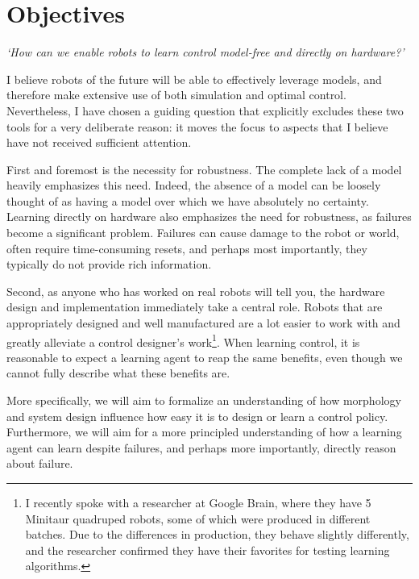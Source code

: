 \section{Objectives}
\emph{`How can we enable robots to learn control model-free and directly on hardware?'} \par
I believe robots of the future will be able to effectively leverage models, and therefore make extensive use of both simulation and optimal control.
Nevertheless, I have chosen a guiding question that explicitly excludes these two tools for a very deliberate reason: it moves the focus to aspects that I believe have not received sufficient attention. \par
First and foremost is the necessity for robustness. The complete lack of a model heavily emphasizes this need. Indeed, the absence of a model can be loosely thought of as having a model over which we have absolutely no certainty.
Learning directly on hardware also emphasizes the need for robustness, as failures become a significant problem. Failures can cause damage to the robot or world, often require time-consuming resets, and perhaps most importantly, they typically do not provide rich information. \par
Second, as anyone who has worked on real robots will tell you, the hardware design and implementation immediately take a central role. Robots that are appropriately designed and well manufactured are a lot easier to work with and greatly alleviate a control designer's work\footnote{I recently spoke with a researcher at Google Brain, where they have 5 Minitaur quadruped robots, some of which were produced in different batches. Due to the differences in production, they behave slightly differently, and the researcher confirmed they have their favorites for testing learning algorithms.}. When learning control, it is reasonable to expect a learning agent to reap the same benefits, even though we cannot fully describe what these benefits are. \par

More specifically, we will aim to formalize an understanding of how morphology and system design influence how easy it is to design or learn a control policy. Furthermore, we will aim for a more principled understanding of how a learning agent can learn despite failures, and perhaps more importantly, directly reason about failure.


